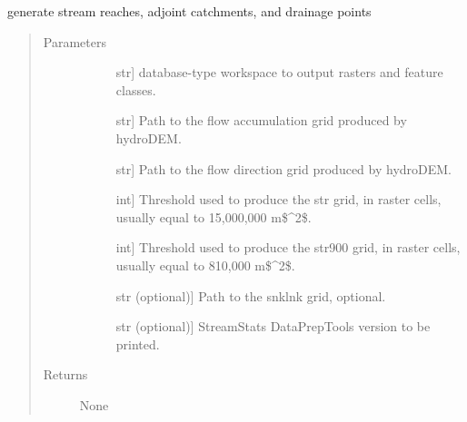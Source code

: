\documentclass[letterpaper,10pt,english]{sphinxmanual}
\begin{document}

\begin{fulllineitems}
\label{\detokenize{make_hydrodem:make_hydrodem.postHydroDEM}}
generate stream reaches, adjoint catchments, and drainage points
\begin{quote}\begin{description}
\item[{Parameters}] \leavevmode\begin{description}
\item[{}] \leavevmode{[}str{]}
database-type workspace to output rasters and feature classes.

\item[{}] \leavevmode{[}str{]}
Path to the flow accumulation grid produced by hydroDEM.

\item[{}] \leavevmode{[}str{]}
Path to the flow direction grid produced by hydroDEM.

\item[{}] \leavevmode{[}int{]}
Threshold used to produce the str grid, in raster cells, usually equal to 15,000,000 m\$\textasciicircum{}2\$.

\item[{}] \leavevmode{[}int{]}
Threshold used to produce the str900 grid, in raster cells, usually equal to 810,000 m\$\textasciicircum{}2\$.

\item[{}] \leavevmode{[}str (optional){]}
Path to the snklnk grid, optional.

\item[{}] \leavevmode{[}str (optional){]}
StreamStats DataPrepTools version to be printed.

\end{description}

\item[{Returns}] \leavevmode\begin{description}
\item[{None}] \leavevmode
\end{description}

\end{description}\end{quote}

\end{fulllineitems}
\end{document}
